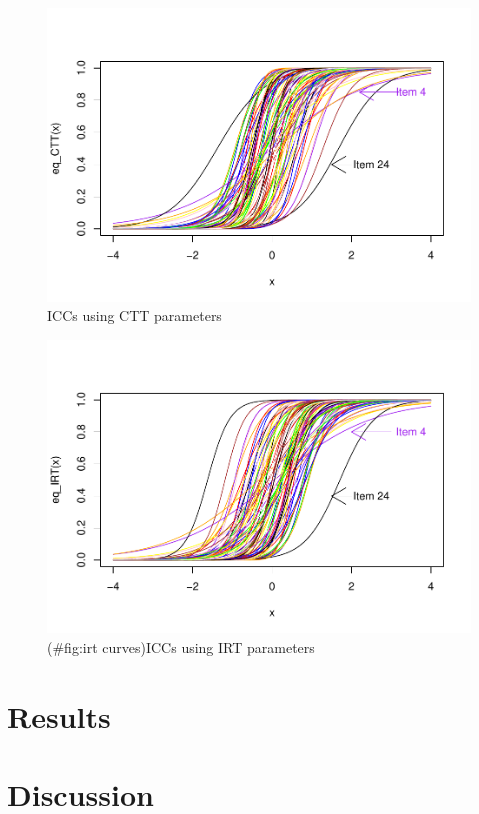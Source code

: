 \documentclass[
  english,
  man,floatsintext]{apa6}
\begin{document}
\begin{figure}
\centering
\includegraphics{ICC_project_files/figure-latex/AUC-1.pdf}
\caption{\label{fig:AUC}ICCs using CTT parameters}
\end{figure}

\begin{figure}
\centering
\includegraphics{ICC_project_files/figure-latex/irt curves-1.pdf}
\caption{(\#fig:irt curves)ICCs using IRT parameters}
\end{figure}

\hypertarget{results-2}{%
\section{Results}\label{results-2}}

\hypertarget{discussion}{%
\section{Discussion}\label{discussion}}
\end{document}
